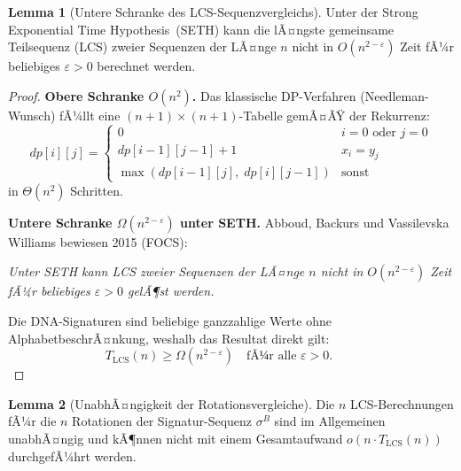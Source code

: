 ﻿\documentclass[a4paper,12pt]{article}
\theoremstyle{definition}
\newtheorem{lemma}{Lemma}
\begin{document}
\begin{lemma}[Untere Schranke des LCS-Sequenzvergleichs]
    \label{lem:lcs}
    Unter der Strong Exponential Time Hypothesis~(SETH) kann die lÃ¤ngste gemeinsame
    Teilsequenz (LCS) zweier Sequenzen der LÃ¤nge $n$ nicht in $O(n^{2-\varepsilon})$
    Zeit fÃ¼r beliebiges $\varepsilon > 0$ berechnet werden.
\end{lemma}

\begin{proof}
    \textbf{Obere Schranke $O(n^2)$.}
    Das klassische DP-Verfahren (Needleman-Wunsch) fÃ¼llt eine
    $(n+1) \times (n+1)$-Tabelle gemÃ¤ÃŸ der Rekurrenz:
    \[
        dp[i][j] = \begin{cases}
            0 & i = 0 \text{ oder } j = 0 \\
            dp[i-1][j-1] + 1 & x_i = y_j \\
            \max(dp[i-1][j],\; dp[i][j-1]) & \text{sonst}
        \end{cases}
    \]
    in $\Theta(n^2)$ Schritten.

    \textbf{Untere Schranke $\Omega(n^{2-\varepsilon})$ unter SETH.}
    Abboud, Backurs und Vassilevska Williams bewiesen 2015 (FOCS):
    \medskip

    \emph{Unter SETH kann LCS zweier Sequenzen der LÃ¤nge $n$ nicht in
    $O(n^{2-\varepsilon})$ Zeit fÃ¼r beliebiges $\varepsilon > 0$ gelÃ¶st werden.}
    \medskip

    Die DNA-Signaturen sind beliebige ganzzahlige Werte ohne AlphabetbeschrÃ¤nkung,
    weshalb das Resultat direkt gilt:
    \[
        T_{\mathrm{LCS}}(n) \geq \Omega(n^{2-\varepsilon})
        \quad \text{fÃ¼r alle } \varepsilon > 0. \qquad 
    \]
\end{proof}

\begin{lemma}[UnabhÃ¤ngigkeit der Rotationsvergleiche]
    \label{lem:unabhaengigkeit}
    Die $n$ LCS-Berechnungen fÃ¼r die $n$ Rotationen der Signatur-Sequenz
    $\sigma^B$ sind im Allgemeinen unabhÃ¤ngig und kÃ¶nnen nicht mit einem
    Gesamtaufwand $o(n \cdot T_{\mathrm{LCS}}(n))$ durchgefÃ¼hrt werden.
\end{lemma}
\end{document}
